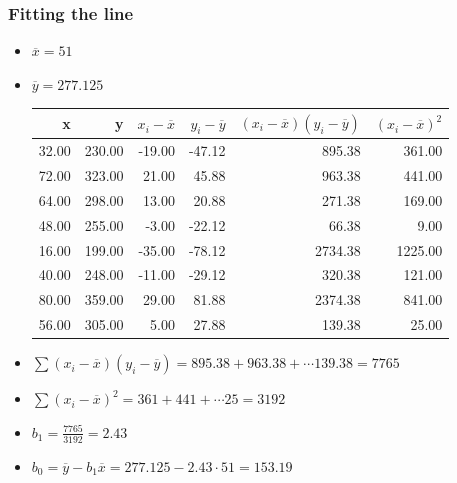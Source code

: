 \documentclass[handout]{beamer}\usepackage[]{graphicx}\usepackage[]{color}
\providecommand{\ov}[1]{\overline{#1}}
\numberwithin{equation}{section}
\begin{document}
\begin{frame}[fragile]
\frametitle{Fitting the line} \scriptsize
\begin{itemize}
\item $\ov{x} = 51$
\item $\ov{y} = 277.125$
\begin{table}[ht]
\centering
\begin{tabular}{rrrrrr}
 x & y & $x_i - \ov{x}$ & $y_i - \ov{y}$ & $(x_i - \ov{x})(y_i - \ov{y})$ & $(x_i - \ov{x})^2$ \\ 
  \hline
32.00 & 230.00 & -19.00 & -47.12 & 895.38 & 361.00 \\ 
  72.00 & 323.00 & 21.00 & 45.88 & 963.38 & 441.00 \\ 
  64.00 & 298.00 & 13.00 & 20.88 & 271.38 & 169.00 \\ 
  48.00 & 255.00 & -3.00 & -22.12 & 66.38 & 9.00 \\ 
  16.00 & 199.00 & -35.00 & -78.12 & 2734.38 & 1225.00 \\ 
  40.00 & 248.00 & -11.00 & -29.12 & 320.38 & 121.00 \\ 
  80.00 & 359.00 & 29.00 & 81.88 & 2374.38 & 841.00 \\ 
  56.00 & 305.00 & 5.00 & 27.88 & 139.38 & 25.00 \\ 
  \end{tabular}
\end{table}

\item $\sum (x_i - \ov{x})(y_i - \ov{y}) = 895.38 +  963.38  + \cdots  139.38  =  7765 $
\item $\sum (x_i - \ov{x})^2= 361 +  441  + \cdots  25  =  3192 $
\item $b_1 = \frac{7765}{3192} = 2.43$ 
\item $b_0 = \ov{y} - b_1 \ov{x} = 277.125 - 2.43 \cdot 51 = 153.19$
\end{itemize}
\end{frame}
\end{document}
